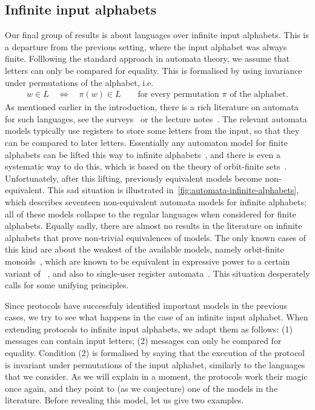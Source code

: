 \subsection{Infinite input alphabets}
\label{sec:intro-infinite}
Our final group of results is about languages over infinite input alphabets. This is a departure from the previous setting, where  the input alphabet was always finite. Folllowing the standard approach in automata theory,  we assume that letters can only be compared for equality. This is formalised by using invariance under  permutations of the alphabet, i.e.
\begin{align*}
w \in L 
\quad \iff \quad
\pi(w) \in L \qquad \text{for every permutation $\pi$ of the alphabet}.
\end{align*}
 As mentioned earlier in the introduction, there is a rich literature on automata for such languages, see the surveys~\cite{neven2003power,segoufin2006automata,bojanczykOrbitFiniteSetsTheir2017} or the lecture notes~\cite{bojanczyk_slightly}.  The  relevant automata models typically use registers to store some letters from the input, so that they can be compared to later letters. Essentially any automaton model for finite alphabets can be lifted this way to infinite alphabets~\cite[Figure 1]{neven2003power}, and there is even a systematic way to do this, which is based on the theory of orbit-finite sets~\cite[Chapter 2]{bojanczyk_slightly}. Unfortunately, after this lifting, previously equivalent models become non-equivalent.  This sad situation is illustrated in~\cref{fig:automata-infinite-alphabets}, which describes seventeen non-equivalent automata models for infinite alphabets; all of these models collapse to the regular languages when considered for finite alphabets. Equally sadly, there are almost no results in the literature on infinite alphabets that prove non-trivial equivalences of models. The only known cases of this kind are about the  weakest of the available models, namely orbit-finite monoids~\cite{bojanczykNominalMonoids2013}, which are known to be equivalent in expressive power to a certain variant of \mso~\cite[Theorems 4.2 and 5.1]{DBLP:journals/corr/ColcombetLP14}, and also to single-user register automata~\cite[Theorem 6]{bojanczykstefanski2020}.
This situation desperately calls for some unifying principles. 

Since protocols have successfuly identified important models in the previous cases, we try to see  what happens in the case of an infinite input alphabet.  When extending protocols to infinite input alphabets, we adapt them as follows: (1) messages can contain input letters; (2)  messages can only be compared for equality. Condition (2) is formalised by saying that the execution of the protocol is invariant under permutations of the input alphabet, similarly to the languages that we consider. As we will explain in a moment, the protocols  work their magic once again, and they point to (as we conjecture)  one of the models in the literature. Before revealing this model, let us give two examples.

